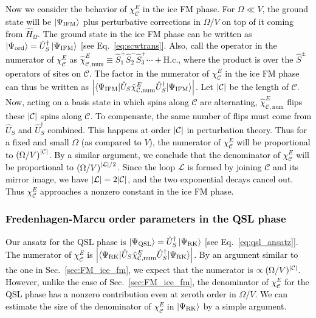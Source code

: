 \documentclass[twocolumn,superscriptaddress,amsmath,amssymb,aps,prx,nofootinbib]{revtex4-2}
\newcommand{\newtext}[1]{\textcolor{black}{#1}}
\begin{document}
\newtext{Now we consider the behavior of $\chi_{\mathcal{C}}^E$ in the ice FM phase. 
For $\Omega \ll V$, the ground state will be $\ket{\Psi_\text{IFM}}$ plus perturbative corrections in $\Omega/V$ on top of it coming from $\hat{H}_\Omega$. 
The ground state in the ice FM phase can be written as $\ket{\Psi_{\text{ord}}} = \hat{U}_S^\dagger \ket{\Psi_{\text{IFM}} }$ [see Eq.~\eqref{eq:scwtrans}]. 
Also, call the operator in the numerator of $\chi_{\mathcal{C}}^E$ as $\hat{\chi}_{\mathcal{C}, \text{num}}^E \equiv \hat{S}_1^+ \hat{S}_2^- \hat{S}_3^+\cdots + \text{H.c.}$, where the product is over the $\hat{S}^\pm$ operators of sites on $\mathcal{C}$.
The factor in the numerator of $\chi_\mathcal{C}^E$ in the ice FM phase can thus be written as $\abs{\langle \Psi_{\text{IFM}} | \hat{U}_S \hat{\chi}_{\mathcal{C}, \text{num}}^E \hat{U}_S^\dagger | \Psi_{\text{IFM}} \rangle} $. Let $\abs{\mathcal{C}}$ be the length of $\mathcal{C}$. Now, acting on a basis state in which spins along $\mathcal{C}$ are alternating, $\hat{\chi}_{\mathcal{C}, \text{num}}^E$ flips these $\abs{\mathcal{C}}$ spins along $\mathcal{C}$.
To compensate, the same number of flips must come from $\hat{U}_S$ and $\hat{U}_S^\dagger$ combined. 
This happens at order $\abs{\mathcal{C}}$ in perturbation theory.
Thus for a fixed and small $\Omega$ (as compared to $V$), the numerator of $\chi_\mathcal{C}^E$ will be proportional to $\left( \Omega/V \right) ^ {\abs{\mathcal{C}}  }$.
By a similar argument, we conclude that the denominator of $\chi_\mathcal{C}^E$ will be proportional to $\left( \Omega / V \right) ^ {\abs{\mathcal{L}} /2 }$.
Since the loop $\mathcal{L}$ is formed by joining $\mathcal{C}$ and its mirror image, we have $\abs{\mathcal{L}} = 2\abs{\mathcal{C}}$, and the two exponential decays cancel out. 
Thus $\chi_{\mathcal{C}}^E$ approaches a nonzero constant in the ice FM phase.
}

\newtext{\subsubsection{Fredenhagen-Marcu order parameters in the QSL phase}} \label{sec:FM_qsl}

\newtext{Our ansatz for the QSL phase is $\ket{\Psi_{\text{QSL}}} = \hat{U}_{S}^\dagger \ket{\Psi_{\text{RK}}}$ [see Eq.~\eqref{eq:qsl_ansatz}]. 
The numerator of $\chi_{\mathcal{C}}^E$ is $\abs{\langle \Psi_{\text{RK}} | \hat{U}_S \hat{\chi}_{\mathcal{C}, \text{num}}^E \hat{U}_S^\dagger | \Psi_{\text{RK}} \rangle} $.
By an argument similar to the one in  Sec.~\ref{sec:FM_ice_fm}, we expect that the numerator is $\propto (\Omega/V)^{\abs{\mathcal{C}}}$.
However, unlike the case of Sec.~\ref{sec:FM_ice_fm}, the denominator of $\chi_\mathcal{C}^E$ for the QSL phase has a nonzero contribution even at zeroth order in $\Omega/V$. 
We can estimate the size of the denominator of $\chi_{\mathcal{C}}^E$ in $\ket{\Psi_{\text{RK}}}$ by a simple argument.}
\end{document}
